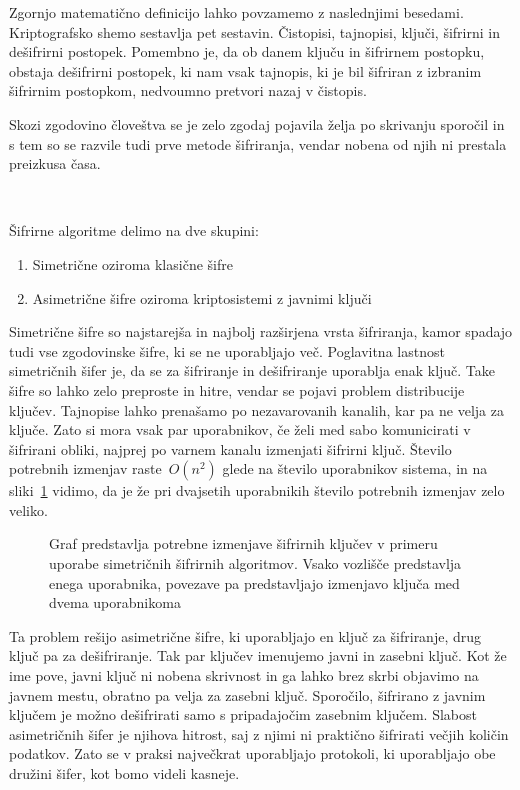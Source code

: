 \documentclass[12pt,a4paper,openany,tikz]{book}
\theoremstyle{plain}
\theoremstyle{definition}
\begin{document}
Zgornjo matematično definicijo lahko povzamemo z naslednjimi besedami. Kriptografsko shemo sestavlja pet sestavin. Čistopisi, tajnopisi, ključi, šifrirni in dešifrirni postopek. Pomembno je, da ob danem ključu in šifrirnem postopku, obstaja dešifrirni postopek, ki nam vsak tajnopis, ki je bil šifriran z izbranim šifrirnim postopkom, nedvoumno pretvori nazaj v čistopis.

Skozi zgodovino človeštva se je zelo zgodaj pojavila želja po skrivanju sporočil in s tem so se razvile tudi prve metode šifriranja, vendar nobena od njih ni prestala preizkusa časa.

\

Šifrirne algoritme delimo na dve skupini:
\begin{enumerate}

	\item Simetrične oziroma klasične šifre
	\item Asimetrične šifre oziroma kriptosistemi z javnimi ključi

\end{enumerate}

Simetrične šifre so najstarejša in najbolj razširjena vrsta šifriranja, kamor spadajo tudi vse zgodovinske šifre, ki se ne uporabljajo več. Poglavitna lastnost simetričnih šifer je, da se za šifriranje in dešifriranje uporablja enak ključ. Take šifre so lahko zelo preproste in hitre, vendar se pojavi problem distribucije ključev. Tajnopise lahko prenašamo po nezavarovanih kanalih, kar pa ne velja za ključe. Zato si mora vsak par uporabnikov, če želi med sabo komunicirati v šifrirani obliki, najprej po varnem kanalu izmenjati šifrirni ključ. Število potrebnih izmenjav raste~$O(n^2)$ glede na število uporabnikov sistema, in na sliki~\ref{fig:symmetricproblem} vidimo, da je že pri dvajsetih uporabnikih število potrebnih izmenjav zelo veliko.

\begin{figure}[ht!]
  \centering
\caption{Graf predstavlja potrebne izmenjave šifrirnih ključev v primeru uporabe simetričnih šifrirnih algoritmov. Vsako vozlišče predstavlja enega uporabnika, povezave pa predstavljajo izmenjavo ključa med dvema uporabnikoma}
\label{fig:symmetricproblem}
\end{figure}

Ta problem rešijo asimetrične šifre, ki uporabljajo en ključ za šifriranje, drug ključ pa za dešifriranje. Tak par ključev imenujemo javni in zasebni ključ. Kot že ime pove, javni ključ ni nobena skrivnost in ga lahko brez skrbi objavimo na javnem mestu, obratno pa velja za zasebni ključ. Sporočilo, šifrirano z javnim ključem je možno dešifrirati samo s pripadajočim zasebnim ključem. Slabost asimetričnih šifer je njihova hitrost, saj z njimi ni praktično šifrirati večjih količin podatkov. Zato se v praksi največkrat uporabljajo protokoli, ki uporabljajo obe družini šifer, kot bomo videli kasneje.
\end{document}

